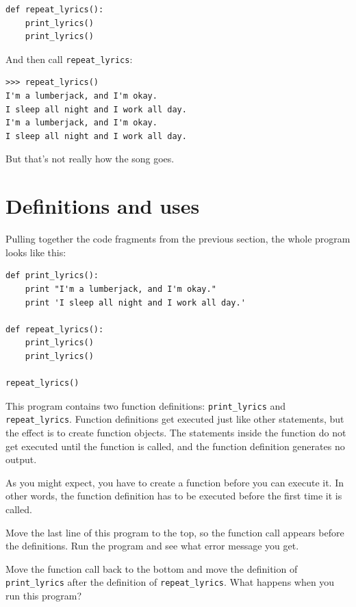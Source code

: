 \documentclass[10pt]{book}
\begin{document}
\beforeverb
\begin{verbatim}
def repeat_lyrics():
    print_lyrics()
    print_lyrics()
\end{verbatim}
\afterverb
%
And then call \verb"repeat_lyrics":

\beforeverb
\begin{verbatim}
>>> repeat_lyrics()
I'm a lumberjack, and I'm okay.
I sleep all night and I work all day.
I'm a lumberjack, and I'm okay.
I sleep all night and I work all day.
\end{verbatim}
\afterverb
%
But that's not really how the song goes.


\section{Definitions and uses}

Pulling together the code fragments from the previous section, the
whole program looks like this:

\beforeverb
\begin{verbatim}
def print_lyrics():
    print "I'm a lumberjack, and I'm okay."
    print 'I sleep all night and I work all day.'

def repeat_lyrics():
    print_lyrics()
    print_lyrics()

repeat_lyrics()
\end{verbatim}
\afterverb
%
This program contains two function definitions: \verb"print_lyrics" and
\verb"repeat_lyrics".  Function definitions get executed just like other
statements, but the effect is to create function objects.  The statements
inside the function do not get executed until the function is called, and
the function definition generates no output.


As you might expect, you have to create a function before you can
execute it.  In other words, the function definition has to be
executed before the first time it is called.

\begin{ex}
Move the last line of this program
to the top, so the function call appears before the definitions. Run 
the program and see what error
message you get.
\end{ex}

\begin{ex}
Move the function call back to the bottom
and move the definition of \verb"print_lyrics" after the definition of
\verb"repeat_lyrics".  What happens when you run this program?
\end{ex}
\end{document}
